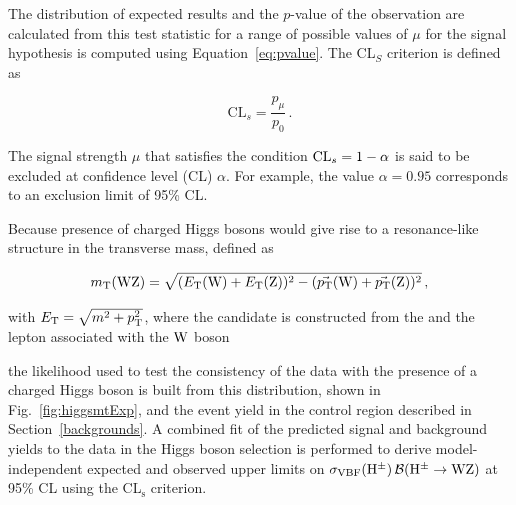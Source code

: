 The distribution of expected results and the 
$p$-value of the observation are calculated from this test statistic for a 
range of possible values of $\mu$ for the signal hypothesis is computed using
Equation~\ref{eq:pvalue}. The CL$_{S}$ criterion is defined as

\begin{equation}
  \mathrm{CL}_{s} = \frac{p_{\mu}}{p_{0}} \,.
\end{equation}

The signal strength $\mu$ that satisfies the condition
${\rm CL}_{s} = 1 - \alpha$ is said to be excluded at 
confidence level (CL) $\alpha$. For example, the value $\alpha=0.95$ corresponds
to an exclusion limit of 95\% CL.

Because presence of charged Higgs bosons would give rise to a resonance-like structure in the 
\WZ transverse mass, defined as

\begin{equation}
  m_{\mathrm{T}}(\mathrm{W}\mathrm{Z}) = \sqrt{(E_{\mathrm{T}}(\mathrm{W}) + E_{\mathrm{T}}(\mathrm{Z}))^2 - (\vec{p_{\mathrm{T}}}(\mathrm{W}) + \vec{p_{\mathrm{T}}}(\mathrm{Z}))^2} \, ,
  \label{eq:wztransmass}
\end{equation}

with $E_{\mathrm{T}} = \sqrt{m^2 + p_{\mathrm{T}}^2}$,
where the \W candidate is constructed from 
the \ptvecmiss 
and the lepton associated with the $\mathrm{W}$ boson

the likelihood used to test the consistency of the data with the presence of a charged Higgs
boson is built from this distribution, shown in Fig.~\ref{fig:higgsmtExp}, 
and the event yield in the
control region described in Section~\ref{backgrounds}.
A combined fit of the predicted signal and background yields to the data 
in the Higgs boson selection is performed 
to derive model-independent expected and observed upper limits on $\sigma_\mathrm{VBF}(\mathrm{H}^{\pm}) \, 
\mathcal{B}(\mathrm{H}^{\pm}\to \mathrm{W}\mathrm{Z})$ at 95\% CL using the CL$\mathrm{_s}$ criterion. 

